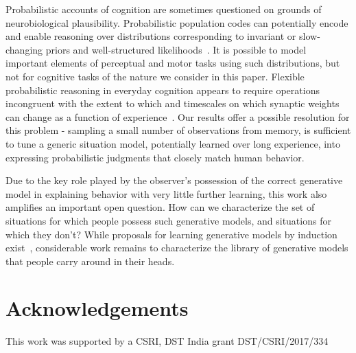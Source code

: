 \documentclass[10pt,letterpaper]{article}
\begin{document}
Probabilistic accounts of cognition are sometimes questioned on grounds of neurobiological plausibility. Probabilistic population codes can potentially encode and enable reasoning over distributions corresponding to invariant or slow-changing priors and well-structured likelihoods~\cite{ma2006bayesian}. It is possible to model important elements of perceptual and motor tasks using such distributions, but not for cognitive tasks of the nature we consider in this paper. Flexible probabilistic reasoning in everyday cognition appears to require operations incongruent with the extent to which and timescales on which synaptic weights can change as a function of experience~\cite{malinow1988persistent}. Our results  offer a possible resolution for this problem - sampling a small number of observations from memory, is sufficient to tune a generic situation model, potentially learned over long experience, into expressing probabilistic judgments that closely match human behavior. 



Due to the key role played by the observer's possession of the correct generative model in explaining behavior with very little further learning, this work also amplifies an important open question. How can we characterize the set of situations for which people possess such generative models, and situations for which they don't? While proposals for learning generative models by induction exist~\cite{kemp2008discovery, tenenbaum2011grow}, considerable work remains to characterize the library of generative models that people carry around in their heads. 

\section{Acknowledgements}
This work was supported by a CSRI, DST India grant DST/CSRI/2017/334



\setlength{\bibleftmargin}{.125in}
\setlength{\bibindent}{-\bibleftmargin}


\end{document}

